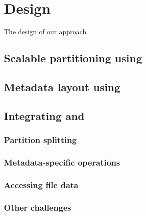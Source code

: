 \section{Design}

The design of our approach

\subsection{Scalable partitioning using \giga{}}

\subsection{Metadata layout using \tfs{}}


\subsection{Integrating \giga{} and \tfs{}}

\subsubsection{Partition splitting}

\subsubsection{Metadata-specific operations}

\subsubsection{Accessing file data}

\subsubsection{Other challenges}

